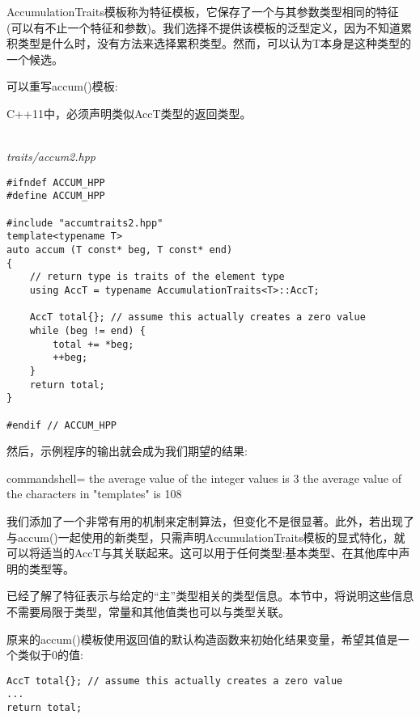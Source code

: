 AccumulationTraits模板称为特征模板，它保存了一个与其参数类型相同的特征(可以有不止一个特征和参数)。我们选择不提供该模板的泛型定义，因为不知道累积类型是什么时，没有方法来选择累积类型。然而，可以认为T本身是这种类型的一个候选。

可以重写accum()模板:

\begin{tcolorbox}[colback=webgreen!5!white,colframe=webgreen!75!black]
\hspace*{0.75cm}C++11中，必须声明类似AccT类型的返回类型。
\end{tcolorbox}

\hspace*{\fill} \\ %
\noindent
\textit{traits/accum2.hpp}
\begin{lstlisting}[style=styleCXX]
#ifndef ACCUM_HPP
#define ACCUM_HPP

#include "accumtraits2.hpp"
template<typename T>
auto accum (T const* beg, T const* end)
{
	// return type is traits of the element type
	using AccT = typename AccumulationTraits<T>::AccT;
	
	AccT total{}; // assume this actually creates a zero value
	while (beg != end) {
		total += *beg;
		++beg;
	}
	return total;
}

#endif // ACCUM_HPP
\end{lstlisting}

然后，示例程序的输出就会成为我们期望的结果:

\begin{tcblisting}{commandshell={}}
the average value of the integer values is 3
the average value of the characters in "templates" is 108
\end{tcblisting}

我们添加了一个非常有用的机制来定制算法，但变化不是很显著。此外，若出现了与accum()一起使用的新类型，只需声明AccumulationTraits模板的显式特化，就可以将适当的AccT与其关联起来。这可以用于任何类型:基本类型、在其他库中声明的类型等。


已经了解了特征表示与给定的“主”类型相关的类型信息。本节中，将说明这些信息不需要局限于类型，常量和其他值类也可以与类型关联。

原来的accum()模板使用返回值的默认构造函数来初始化结果变量，希望其值是一个类似于0的值:

\begin{lstlisting}[style=styleCXX]
AccT total{}; // assume this actually creates a zero value
...
return total;
\end{lstlisting}

